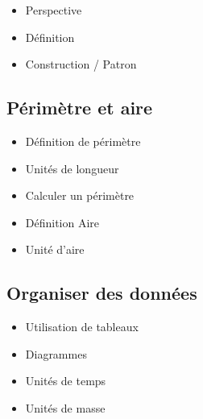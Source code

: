 \begin{itemize}
	\item Perspective
	\item Définition
	\item Construction / Patron
\end{itemize}

\subsection{Périmètre et aire}

\begin{itemize}
	\item Définition de périmètre
	\item Unités de longueur
	\item Calculer un périmètre
	\item Définition Aire
	\item Unité d'aire
\end{itemize}

\subsection{Organiser des données}

\begin{itemize}
	\item Utilisation de tableaux
	\item Diagrammes
	\item Unités de temps
	\item Unités de masse	
\end{itemize}